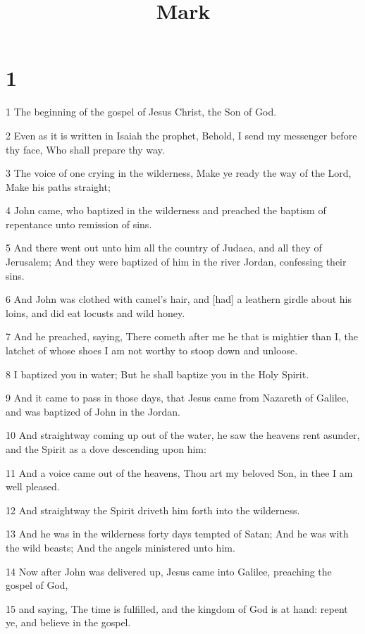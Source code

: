 

\title{Mark}

\chapter{1}

\par 1 The beginning of the gospel of Jesus Christ, the Son of God.
\par 2 Even as it is written in Isaiah the prophet, Behold, I send my messenger before thy face, Who shall prepare thy way.
\par 3 The voice of one crying in the wilderness, Make ye ready the way of the Lord, Make his paths straight;
\par 4 John came, who baptized in the wilderness and preached the baptism of repentance unto remission of sins.
\par 5 And there went out unto him all the country of Judaea, and all they of Jerusalem; And they were baptized of him in the river Jordan, confessing their sins.
\par 6 And John was clothed with camel's hair, and [had] a leathern girdle about his loins, and did eat locusts and wild honey.
\par 7 And he preached, saying, There cometh after me he that is mightier than I, the latchet of whose shoes I am not worthy to stoop down and unloose.
\par 8 I baptized you in water; But he shall baptize you in the Holy Spirit.
\par 9 And it came to pass in those days, that Jesus came from Nazareth of Galilee, and was baptized of John in the Jordan.
\par 10 And straightway coming up out of the water, he saw the heavens rent asunder, and the Spirit as a dove descending upon him:
\par 11 And a voice came out of the heavens, Thou art my beloved Son, in thee I am well pleased.
\par 12 And straightway the Spirit driveth him forth into the wilderness.
\par 13 And he was in the wilderness forty days tempted of Satan; And he was with the wild beasts; And the angels ministered unto him.
\par 14 Now after John was delivered up, Jesus came into Galilee, preaching the gospel of God,
\par 15 and saying, The time is fulfilled, and the kingdom of God is at hand: repent ye, and believe in the gospel.
